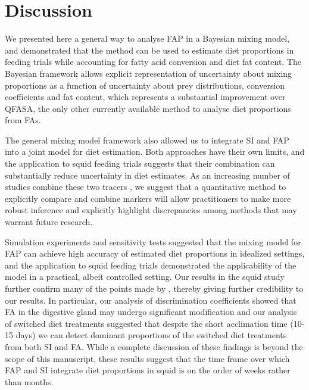\documentclass[fleqn,10pt]{wlpeerj}
\begin{document}



\section*{Discussion}

We presented here a general way to analyse FAP in a Bayesian mixing
model, and demonstrated that the method can be used to estimate diet proportions
in feeding trials while accounting for fatty acid conversion and diet
fat content. The Bayesian framework allows explicit representation of
uncertainty about mixing proportions as a function of uncertainty
about prey distributions, conversion coefficients and fat content,
which represents a substantial improvement over QFASA, the only other
currently available method to analyse diet proportions from FAs.

The general mixing model framework also allowed us to integrate SI and
FAP into a joint model for diet estimation. Both approaches have their
own limits, and the application to squid feeding trials suggests that their combination can substantially reduce uncertainty in diet estimates. As an increasing number of studies combine
these two tracers \citep{tucker_convergence_2008,guest_evidence_2008,guest_trophic_2009,stowasser_experimental_2006,van_der_bank_dietary_2011,jaschinski_carbon_2008},
we suggest that a quantitative method to explicitly compare and combine
markers will allow practitioners to make more robust inference and
explicitly highlight discrepancies among methods that may warrant
future research.

Simulation experiments and sensitivity tests suggested that the mixing model for FAP can
achieve high accuracy of estimated diet proportions in idealized
settings, and the application to squid feeding trials demonstrated the
applicability of the model in a practical, albeit controlled setting. Our results in the
squid study further confirm many of the points made by
\citet{stowasser_experimental_2006}, thereby giving further credibility to our
results. In particular, our analysis of discrimination coefficients
showed that FA in the digestive gland may undergo significant
modification and our analysis of switched diet treatments suggested
that despite the short acclimation time (10-15 days) we can detect
dominant proportions of the switched diet treatments from both SI and
FA. While a complete discussion of these findings is beyond the scope
of this manuscript, these results suggest that the time frame over
which FAP and SI integrate diet proportions in squid is on the order of
weeks rather than months.
\end{document}
